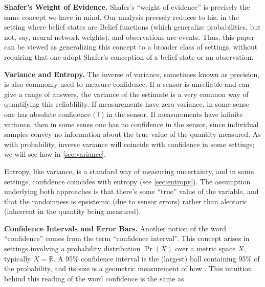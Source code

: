 {	\textbf{Shafer's Weight of Evidence.}
	Shafer's ``weight of evidence'' is precisely the same concept we have in mind.
	Our analysis precsely reduces to his, in the setting where belief states are Belief functions (which generalize probabilities, but not, say, neural network weights), and observations are events.
	Thus, this paper can be viewed as generalizing this concept to a broader class of settings, without requiring that one adopt Shafer's conception of a belief state or an observation.


	\textbf{Variance and Entropy.}
	The inverse of variance, sometimes known as precision,
		is also commonly used to measure confidence.
	If a sensor is unreliable and can give a range of answers, the variance of the estimate is a very common way of quantifying this reliablility.
	If measurements have zero variance, in some sense one has absolute confidence ($\top$) in the sensor. If measurements have infinite variance, then in some sense one has no confidence in the sensor, since individual samples convey no information about the true value of the quantity measured.
	As with probability, inverse variance will coincide with confidence in some settings; we will see how in \cref{sec:variance}.

	Entropy, like variance, is a standard way of measuring uncertainty, and in some settings, confidence coincides with entropy (see \cref{sec:entropy}).
	The assumption underlying both approaches is that there's some ``true'' value of the variable, and that the randomness is epsistemic (due to sensor errors) rather than aleotoric (inherrent in the quantity being measured).

	\textbf{Confidence Intervals and Error Bars.}
	Another notion of the word ``confidence'' comes from the term ``confidence interval''.
	This concept arises in settings involving a probability distribution $\Pr(X)$ over a metric space $X$, typically $X = \mathbb R$.
	A 95\% confidence interval is the (largest) ball containing 95\% of the probability, and its size is a geometric measurement of how .
	This intuition behind this reading of the word confidence is the same as
}
